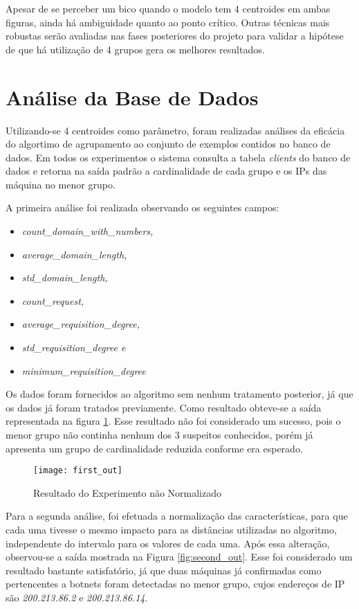 Apesar de se perceber um bico quando o modelo tem 4 centroides em ambas figuras, ainda há ambiguidade quanto ao ponto crítico. Outras técnicas mais robustas serão avaliadas nas fases posteriores do projeto para validar a hipótese de que há utilização de 4 grupos gera os melhores resultados.

\section{Análise da Base de Dados}

Utilizando-se 4 centroides como parâmetro, foram realizadas análises da eficácia do algortimo de agrupamento ao conjunto de exemplos contidos no banco de dados. Em todos os experimentos o sistema consulta a tabela \textit{clients} do banco de dados e retorna na saída padrão a cardinalidade de cada grupo e os IPs das máquina no menor grupo.

A primeira análise foi realizada observando os seguintes campos:

\begin{itemize}
\item \textit{count\_domain\_with\_numbers, }
\item \textit{average\_domain\_length, }
\item \textit{std\_domain\_length, }
\item \textit{count\_request, }
\item \textit{average\_requisition\_degree, }
\item \textit{std\_requisition\_degree e }
\item \textit{minimum\_requisition\_degree }
\end{itemize}

Os dados foram fornecidos ao algoritmo sem nenhum tratamento posterior, já que os dados já foram tratados previamente. Como resultado obteve-se a saída representada na figura \ref{fig:first_out}. Esse resultado não foi considerado um sucesso, pois o menor grupo não continha nenhum dos 3 suspeitos conhecidos, porém já apresenta um grupo de cardinalidade reduzida conforme era esperado.

\begin{figure}[htbp]
\centering
\texttt{[image: first\_out]}
\caption[Resultado do Experimento não Normalizado]{Resultado do Experimento não Normalizado} \label{fig:first_out}
\end{figure}

Para a segunda análise, foi efetuada a normalização das características, para que cada uma tivesse o mesmo impacto para as distâncias utilizadas no algoritmo, independente do intervalo para os valores de cada uma. Após essa alteração, observou-se a saída mostrada na Figura \ref{fig:second_out}. Esse foi considerado um resultado bastante satisfatório, já que duas máquinas já confirmadas como pertencentes a botnets foram detectadas no menor grupo, cujos endereços de IP são \textit{200.213.86.2} e \textit{200.213.86.14}.

